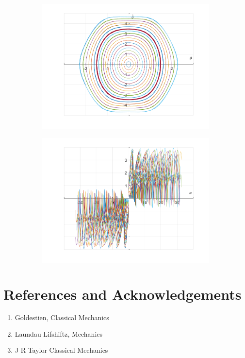 \documentclass{article}
\begin{document}
	\begin{figure}[h!]
		\centering
		\begin{subfigure}[b]{0.48\linewidth}
			\includegraphics[width=\linewidth]{./SmallOscillations/Chaotic/F5.png}
		\end{subfigure}
		\begin{subfigure}[b]{0.48\linewidth}
			\includegraphics[width=\linewidth]{./SmallOscillations/Chaotic/F6.png}
		\end{subfigure}
	\end{figure}
	\newpage
	
	\section*{References and Acknowledgements}
		\begin{enumerate}
			\item Goldestien, Classical Mechanics
			\item Laundau Lifshiftz, Mechanics
			\item J R Taylor Classical Mechanics
		\end{enumerate}
\end{document}
